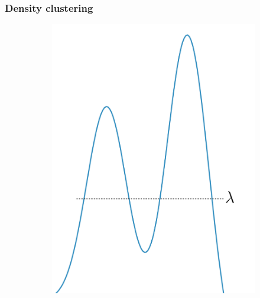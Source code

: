 \subsubsection{Density clustering}

\begin{figure}[h]
\centering 
\begin{subfigure}{.5\columnwidth}
    \includegraphics[width=\columnwidth]{main_figures/intro/density_cluster.png}
    \caption{}
    \label{fig:density}
\end{subfigure}%
\begin{subfigure}{.5\columnwidth}

\end{subfigure}
\end{figure}
